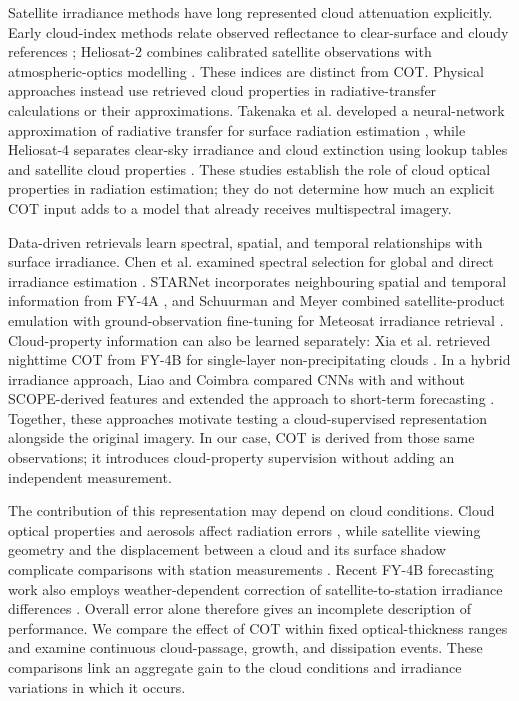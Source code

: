 \documentclass[11pt]{article}
\begin{document}
Satellite irradiance methods have long represented cloud attenuation explicitly. Early cloud-index methods relate observed reflectance to clear-surface and cloudy references \cite{cano1986}; Heliosat-2 combines calibrated satellite observations with atmospheric-optics modelling \cite{rigollier2004}. These indices are distinct from COT. Physical approaches instead use retrieved cloud properties in radiative-transfer calculations or their approximations. Takenaka et al. developed a neural-network approximation of radiative transfer for surface radiation estimation \cite{takenaka2011}, while Heliosat-4 separates clear-sky irradiance and cloud extinction using lookup tables and satellite cloud properties \cite{qu2017}. These studies establish the role of cloud optical properties in radiation estimation; they do not determine how much an explicit COT input adds to a model that already receives multispectral imagery.

Data-driven retrievals learn spectral, spatial, and temporal relationships with surface irradiance. Chen et al. examined spectral selection for global and direct irradiance estimation \cite{chen2023}. STARNet incorporates neighbouring spatial and temporal information from FY-4A \cite{song2025}, and Schuurman and Meyer combined satellite-product emulation with ground-observation fine-tuning for Meteosat irradiance retrieval \cite{schuurman2025}. Cloud-property information can also be learned separately: Xia et al. retrieved nighttime COT from FY-4B for single-layer non-precipitating clouds \cite{xia2025}. In a hybrid irradiance approach, Liao and Coimbra compared CNNs with and without SCOPE-derived features and extended the approach to short-term forecasting \cite{liao2024}. Together, these approaches motivate testing a cloud-supervised representation alongside the original imagery. In our case, COT is derived from those same observations; it introduces cloud-property supervision without adding an independent measurement.

The contribution of this representation may depend on cloud conditions. Cloud optical properties and aerosols affect radiation errors \cite{pap2024}, while satellite viewing geometry and the displacement between a cloud and its surface shadow complicate comparisons with station measurements \cite{wiltink2025}. Recent FY-4B forecasting work also employs weather-dependent correction of satellite-to-station irradiance differences \cite{shen2026fy4b}. Overall error alone therefore gives an incomplete description of performance. We compare the effect of COT within fixed optical-thickness ranges and examine continuous cloud-passage, growth, and dissipation events. These comparisons link an aggregate gain to the cloud conditions and irradiance variations in which it occurs.
\end{document}
